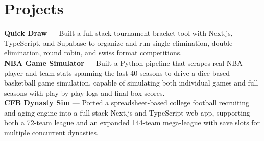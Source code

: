 \section*{Projects}
\textbf{Quick Draw} --- Built a full-stack tournament bracket tool with Next.js, TypeScript, and Supabase to organize and run single-elimination, double-elimination, round robin, and swiss format competitions.\\[4pt]
\textbf{NBA Game Simulator} --- Built a Python pipeline that scrapes real NBA player and team stats spanning the last 40 seasons to drive a dice-based basketball game simulation, capable of simulating both individual games and full seasons with play-by-play logs and final box scores.\\[4pt]
\textbf{CFB Dynasty Sim} --- Ported a spreadsheet-based college football recruiting and aging engine into a full-stack Next.js and TypeScript web app, supporting both a 72-team league and an expanded 144-team mega-league with save slots for multiple concurrent dynasties.
